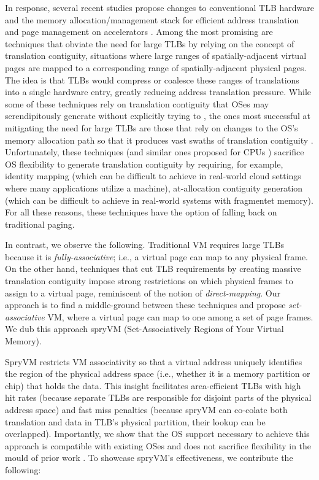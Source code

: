 In response, several recent studies propose changes to conventional
TLB hardware and the memory allocation/management stack for efficient
address translation and page management on accelerators
\cite{pichai:architectural, power:supporting,
  ausavarungnirun:mosaic}. Among the most promising are techniques
that obviate the need for large TLBs by relying on the concept of
translation contiguity, situations where large ranges of
spatially-adjacent virtual pages are mapped to a corresponding range
of spatially-adjacent physical pages. The idea is that TLBs would
compress or coalesce these ranges of translations into a single
hardware entry, greatly reducing address translation pressure. While
some of these techniques rely on translation contiguity that OSes may
serendipitously generate without explicitly trying to \cite{pham:colt,
  bhattacharjee:large-reach, cox:efficient, pham:increasing}, the ones
most successful at mitigating the need for large TLBs are those that
rely on changes to the OS's memory allocation path so that it produces
vast swaths of translation contiguity
\cite{haria:devirtualizing}. Unfortunately, these techniques (and
similar ones proposed for CPUs \cite{basu:efficient, gandhi:range})
sacrifice OS flexibility to generate translation contiguity by
requiring, for example, identity mapping (which can be difficult to
achieve in real-world cloud settings where many applications utilize a
machine), at-allocation contiguity generation (which can be difficult
to achieve in real-world systems with fragmentet memory). For all
these reasons, these techniques have the option of falling back on
traditional paging.

In contrast, we observe the following. Traditional VM requires large
TLBs because it is {\it fully-associative}; i.e., a virtual page can
map to any physical frame. On the other hand, techniques that cut TLB
requirements by creating massive translation contiguity
\cite{basu:efficient, gandhi:range, haria:devirtualizing} impose
strong restrictions on which physical frames to assign to a virtual
page, reminiscent of the notion of {\it direct-mapping}. Our approach
is to find a middle-ground between these techniques and propose {\it
  set-associative} VM, where a virtual page can map to one among a set
of page frames. We dub this approach spryVM (Set-Associatively Regions
of Your Virtual Memory). 

SpryVM restricts VM associativity so that a virtual address uniquely
identifies the region of the physical address space (i.e., whether it
is a memory partition or chip) that holds the data. This insight
facilitates area-efficient TLBs with high hit rates (because separate
TLBs are responsible for disjoint parts of the physical address space)
and fast miss penalties (because spryVM can co-colate both translation
and data in TLB's physical partition, their lookup can be
overlapped). Importantly, we show that the OS support necessary to
achieve this approach is compatible with existing OSes and does not
sacrifice flexibility in the mould of prior work \cite{basu:efficient,
  haria:devirtualizing}. To showcase spryVM's effectiveness, we
contribute the following:

